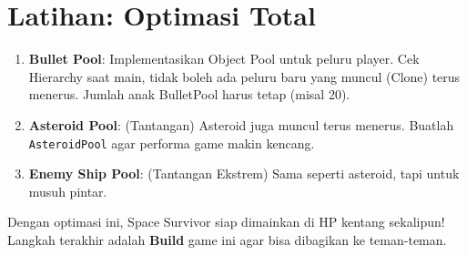 
\section{Latihan: Optimasi Total}

\begin{enumerate}
    \item \textbf{Bullet Pool}: Implementasikan Object Pool untuk peluru player. Cek Hierarchy saat main, tidak boleh ada peluru baru yang muncul (Clone) terus menerus. Jumlah anak BulletPool harus tetap (misal 20).
    \item \textbf{Asteroid Pool}: (Tantangan) Asteroid juga muncul terus menerus. Buatlah \texttt{AsteroidPool} agar performa game makin kencang.
    \item \textbf{Enemy Ship Pool}: (Tantangan Ekstrem) Sama seperti asteroid, tapi untuk musuh pintar.
\end{enumerate}

Dengan optimasi ini, Space Survivor siap dimainkan di HP kentang sekalipun! Langkah terakhir adalah \textbf{Build} game ini agar bisa dibagikan ke teman-teman.

